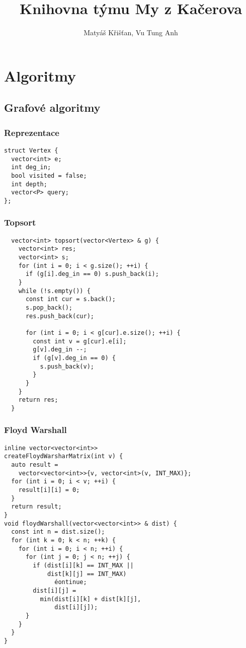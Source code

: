 \documentclass{article}
\title{Knihovna týmu My z Kačerova}
\author{Matyáš Křišťan, Vu Tung Anh}
\begin{document}
\maketitle
{}
\newpage
{}


\section{Algoritmy}
\subsection{Grafové algoritmy}
\subsubsection{Reprezentace}
\begin{lstlisting}
struct Vertex {
  vector<int> e;
  int deg_in;
  bool visited = false;
  int depth;
  vector<P> query;
};
\end{lstlisting}

\subsubsection{Topsort}
\begin{lstlisting}
  vector<int> topsort(vector<Vertex> & g) {
    vector<int> res;
    vector<int> s;
    for (int i = 0; i < g.size(); ++i) {
      if (g[i].deg_in == 0) s.push_back(i);
    }
    while (!s.empty()) {
      const int cur = s.back();
      s.pop_back();
      res.push_back(cur);

      for (int i = 0; i < g[cur].e.size(); ++i) {
        const int v = g[cur].e[i];
        g[v].deg_in --;
        if (g[v].deg_in == 0) {
          s.push_back(v);
        }
      }
    }
    return res;
  }
\end{lstlisting}

\subsubsection{Floyd Warshall}
\begin{lstlisting}
inline vector<vector<int>> 
createFloydWarsharMatrix(int v) {
  auto result = 
    vector<vector<int>>{v, vector<int>(v, INT_MAX)};
  for (int i = 0; i < v; ++i) {
    result[i][i] = 0;
  }
  return result;
}
void floydWarshall(vector<vector<int>> & dist) {
  const int n = dist.size();
  for (int k = 0; k < n; ++k) {
    for (int i = 0; i < n; ++i) {
      for (int j = 0; j < n; ++j) {
        if (dist[i][k] == INT_MAX || 
            dist[k][j] == INT_MAX) 
              éontinue;
        dist[i][j] = 
          min(dist[i][k] + dist[k][j], 
              dist[i][j]);
      }
    }
  }
}
\end{lstlisting}
\end{document}
